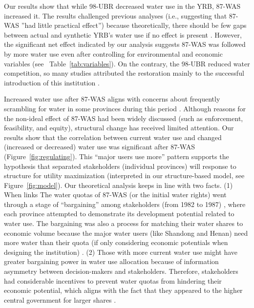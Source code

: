 
\label{discussion-1}
Our results show that while 98-UBR decreased water use in the YRB, 87-WAS increased it.
The results challenged previous analyses (i.e., suggesting that 87-WAS ''had little practical effect'') because theoretically, there should be few gaps between actual and synthetic YRB's water use if no effect is present \cite{abadie2015,hill2021}.
However, the significant net effect indicated by our analysis suggests 87-WAS was followed by more water use even after controlling for environmental and economic variables (see \textit{}~Table~\ref{tab:variables}).
On the contrary, the 98-UBR reduced water competition, so many studies attributed the restoration mainly to the successful introduction of this institution \cite{chen2021,huangang2002,an2007}.

\label{discussion-2}
Increased water use after 87-WAS aligns with concerns about frequently scrambling for water in some provinces during this period \cite{mao2000}.
Although reasons for the non-ideal effect of 87-WAS had been widely discussed \cite{huangang2002} (such as enforcement, feasibility, and equity), structural change has received limited attention.
Our results show that the correlation between current water use and changed (increased or decreased) water use was significant after 87-WAS (Figure~\ref{fig:regulating}).
This ``major users use more'' pattern supports the hypothesis that separated stakeholders (individual provinces) will response to structure for utility maximization (interpreted in our structure-based model, see Figure~\ref{fig:model}).
Our theoretical analysis keeps in line with two facts.
(1) When links The water quotas of 87-WAS (or the initial water rights) went through a stage of ``bargaining'' among stakeholders (from 1982 to 1987) \cite{wang2019a, wang2019d}, where each province attempted to demonstrate its development potential related to water use.
The bargaining was also a process for matching their water shares to economic volume because the major water users (like Shandong and Henan) need more water than their quota (if only considering economic potentials when designing the institution) \cite{zuo2020}.
(2) Those with more current water use might have greater bargaining power in water use allocation because of information asymmetry between decision-makers and stakeholders.
Therefore, stakeholders had considerable incentives to prevent water quotas from hindering their economic potential, which aligns with the fact that they appeared to the higher central government for larger shares \cite{wang2019a, wang2019d}.

